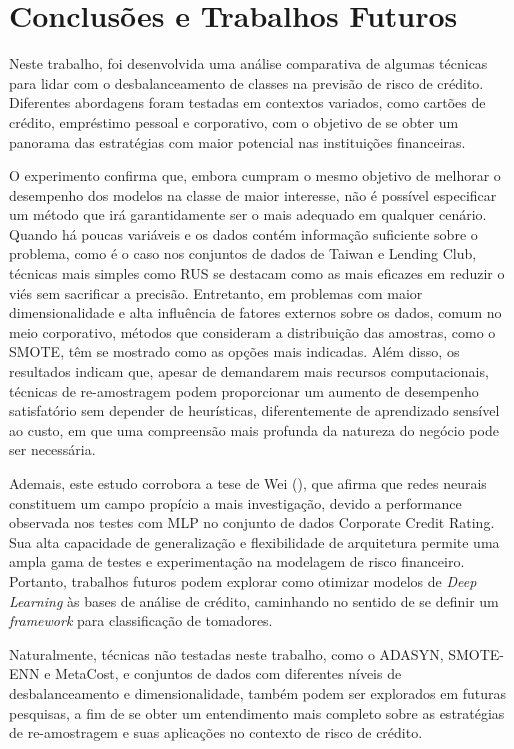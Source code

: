 \chapter{Conclusões e Trabalhos Futuros}
\label{cap:conclusao}

Neste trabalho, foi desenvolvida uma análise comparativa de algumas técnicas para lidar com o desbalanceamento de classes na previsão de risco de crédito. Diferentes abordagens foram testadas em contextos variados, como cartões de crédito, empréstimo pessoal e corporativo, com o objetivo de se obter um panorama das estratégias com maior potencial nas instituições financeiras.

O experimento confirma que, embora cumpram o mesmo objetivo de melhorar o desempenho dos modelos na classe de maior interesse, não é possível especificar um método que irá garantidamente ser o mais adequado em qualquer cenário. Quando há poucas variáveis e os dados contém informação suficiente sobre o problema, como é o caso nos conjuntos de dados de Taiwan e Lending Club, técnicas mais simples como RUS se destacam como as mais eficazes em reduzir o viés sem sacrificar a precisão. Entretanto, em problemas com maior dimensionalidade e alta influência de fatores externos sobre os dados, comum no meio corporativo, métodos que consideram a distribuição das amostras, como o SMOTE, têm se mostrado como as opções mais indicadas. Além disso, os resultados indicam que, apesar de demandarem mais recursos computacionais, técnicas de re-amostragem podem proporcionar um aumento de desempenho satisfatório sem depender de heurísticas, diferentemente de aprendizado sensível ao custo, em que uma compreensão mais profunda da natureza do negócio pode ser necessária.

Ademais, este estudo corrobora a tese de Wei (\citeyear{Wei2025}), que afirma que redes neurais constituem um campo propício a mais investigação, devido a performance observada nos testes com MLP no conjunto de dados Corporate Credit Rating. Sua alta capacidade de generalização e flexibilidade de arquitetura permite uma ampla gama de testes e experimentação na modelagem de risco financeiro. Portanto, trabalhos futuros podem explorar como otimizar modelos de \textit{Deep Learning} às bases de análise de crédito, caminhando no sentido de se definir um \textit{framework} para classificação de tomadores.

Naturalmente, técnicas não testadas neste trabalho, como o ADASYN, SMOTE-ENN e MetaCost, e conjuntos de dados com diferentes níveis de desbalanceamento e dimensionalidade, também podem ser explorados em futuras pesquisas, a fim de se obter um entendimento mais completo sobre as estratégias de re-amostragem e suas aplicações no contexto de risco de crédito.